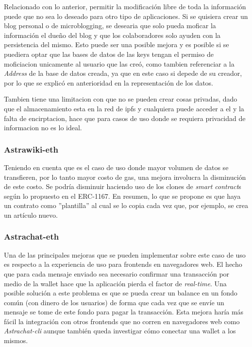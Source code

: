 Relacionado con lo anterior, permitir la modificación libre de toda la información puede que no sea lo deseado para otro tipo de aplicaciones. Si se quisiera crear un blog personal o de microblogging, se desearia que solo  pueda moficar la información el dueño del blog y que los colaboradores solo ayuden con la persistencia del mismo. Esto puede ser una posible mejora y es posible si se puediera optar que las bases de datos de las keys tengan el permiso de moficiacion unicamente al usuario que las creó, como tambien referenciar a la \textit{Address} de la base de datos creada, ya que en este caso si depede de su creador, por lo que se explicó en anterioridad en la representación de los datos.

Tambien tiene una limitacion con que no se pueden crear cosas privadas, dado que el almacenamiento esta en la red de ipfs y cualquiera puede acceder a el y la falta de encirptacion, hace que para casos de uso donde se requiera privacidad de informacion no es lo ideal.

\subsubsection{Astrawiki-eth}

Teniendo en cuenta que es el caso de uso donde mayor volumen de datos se transfieren, por lo tanto mayor costo de gas, una mejora involucra la disminución de este costo. Se podría disminuir haciendo uso de los clones de \textit{smart contract}s según lo propuesto en el ERC-1167\cite{erc-1167}. En resumen, lo que se propone es que haya un contrato como ''plantilla'' al cual se lo copia cada vez que, por ejemplo, se crea un artículo nuevo.

\subsubsection{Astrachat-eth}

Una de las principales mejoras que se pueden implementar sobre este caso de uso es respecto a la experiencia de uso para frontends en navegadores web. El hecho que para cada mensaje enviado sea necesario confirmar una transacción por medio de la wallet hace que la aplicación pierda el factor de \textit{real-time}. Una posible solución a este problema es que se pueda crear un balance en un fondo común (con dinero de los usuarios) de forma que cada vez que se envíe un mensaje se tome de este fondo para pagar la transacción. Esta mejora haría más fácil la integración con otros frontends que no corren en navegadores web como \textit{Astrachat-cli} aunque también queda investigar cómo conectar una wallet a los mismos.

